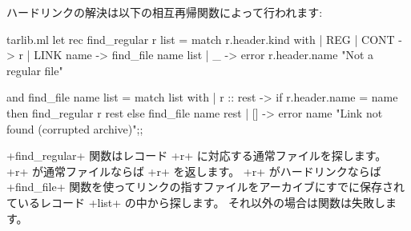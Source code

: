 ハードリンクの解決は以下の相互再帰関数によって行われます:
\begin{listingcodefile}{tarlib.ml}
let rec find_regular r list = match r.header.kind with
  | REG | CONT -> r
  | LINK name -> find_file name list
  | _ -> error r.header.name "Not a regular file"

and find_file name list = match list with
  | r :: rest ->
      if r.header.name = name then find_regular r rest
      else find_file name rest
  | [] -> error name "Link not found (corrupted archive)";;
\end{listingcodefile}
\ml+find_regular+ 関数はレコード \ml+r+ に対応する通常ファイルを探します。
\ml+r+ が通常ファイルならば \ml+r+ を返します。
\ml+r+ がハードリンクならば \ml+find_file+ 関数を使ってリンクの指すファイルをアーカイブにすでに保存されているレコード \ml+list+ の中から探します。
それ以外の場合は関数は失敗します。

